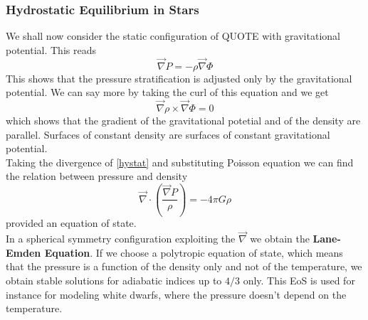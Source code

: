 \documentclass[11pt]{article}
\begin{document}
\subsubsection{Hydrostatic Equilibrium in Stars}
We shall now consider the static configuration of QUOTE with gravitational potential. This reads
\begin{equation} \label{hystat}
	\vec \nabla P = - \rho \vec \nabla \Phi
\end{equation}
This shows that the pressure stratification is adjusted only by the gravitational potential. We can say more by taking the curl of this equation and we get
$$
\vec \nabla \rho \times  \vec \nabla \Phi =0
$$
which shows that the gradient of the gravitational potetial and of the density are parallel. Surfaces of constant density are surfaces of constant gravitational potential.\\
Taking the divergence of \ref{hystat} and substituting Poisson equation we can find the relation between pressure and density
$$
\vec \nabla \cdot \left ( \frac{\vec \nabla P}{\rho} \right ) = - 4 \pi G \rho 
$$
provided an equation of state.\\
In a spherical symmetry configuration exploiting the $\vec \nabla$ we obtain the \textbf{Lane-Emden Equation}. If we choose a polytropic equation of state, which means that the pressure is a function of the density only and not of the temperature, we obtain stable solutions for adiabatic indices up to $4/3$ only. This EoS is used for instance for modeling white dwarfs, where the pressure doesn't depend on the temperature. \\ 
\end{document}
